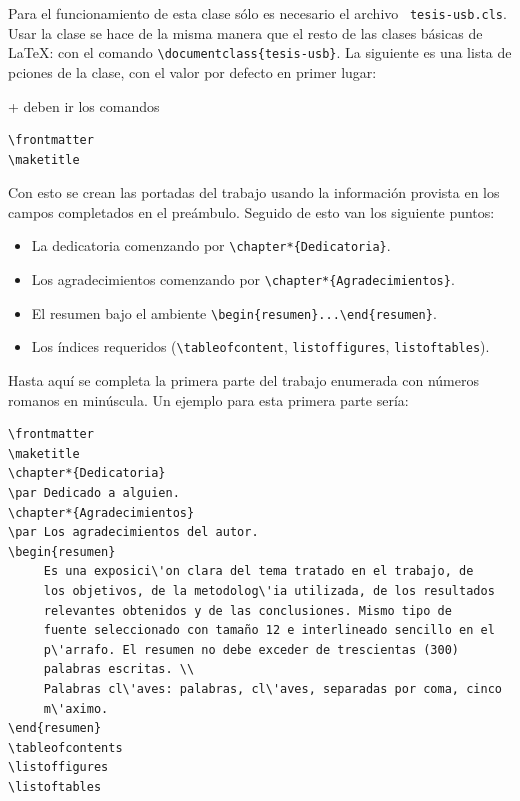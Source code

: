 \par Para el funcionamiento de esta clase s\'olo es necesario el archivo ~\texttt{tesis-usb.cls}. Usar la clase se hace de la misma manera que el resto de las clases b\'asicas de \LaTeX: con el comando \verb+\documentclass{tesis-usb}+. La siguiente es una lista de pciones de la clase, con el valor por defecto en primer lugar:
\begin{document}
+ deben ir los comandos 
\begin{verbatim}
\frontmatter
\maketitle
\end{verbatim}
Con esto se crean las portadas del trabajo usando la informaci\'on provista en los campos completados en el pre\'ambulo. Seguido de esto van los siguiente puntos:
\begin{itemize}
     \item La dedicatoria comenzando por \verb+\chapter*{Dedicatoria}+.
     \item Los agradecimientos comenzando por \verb+\chapter*{Agradecimientos}+.
     \item El resumen bajo el ambiente \verb+\begin{resumen}...\end{resumen}+.
     \item Los \'indices requeridos (\verb+\tableofcontent+, \verb+listoffigures+, \verb+listoftables+).
\end{itemize}
\par Hasta aqu\'i se completa la primera parte del trabajo enumerada con n\'umeros romanos en minúscula. Un ejemplo para esta primera parte ser\'ia:
\begin{verbatim}
\frontmatter
\maketitle
\chapter*{Dedicatoria}
\par Dedicado a alguien.
\chapter*{Agradecimientos}
\par Los agradecimientos del autor.
\begin{resumen}
     Es una exposici\'on clara del tema tratado en el trabajo, de 
     los objetivos, de la metodolog\'ia utilizada, de los resultados 
     relevantes obtenidos y de las conclusiones. Mismo tipo de 
     fuente seleccionado con tamaño 12 e interlineado sencillo en el 
     p\'arrafo. El resumen no debe exceder de trescientas (300) 
     palabras escritas. \\
     Palabras cl\'aves: palabras, cl\'aves, separadas por coma, cinco 
     m\'aximo.
\end{resumen}
\tableofcontents
\listoffigures
\listoftables
\end{verbatim}
\end{document}
